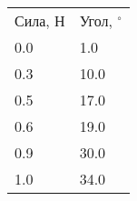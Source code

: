 \begin{tabular}{ll}
\hline
 Сила, Н & Угол, $^\circ$ \\
 0.0     & 1.0            \\
 0.3     & 10.0           \\
 0.5     & 17.0           \\
 0.6     & 19.0           \\
 0.9     & 30.0           \\
 1.0     & 34.0           \\
\hline
\end{tabular}